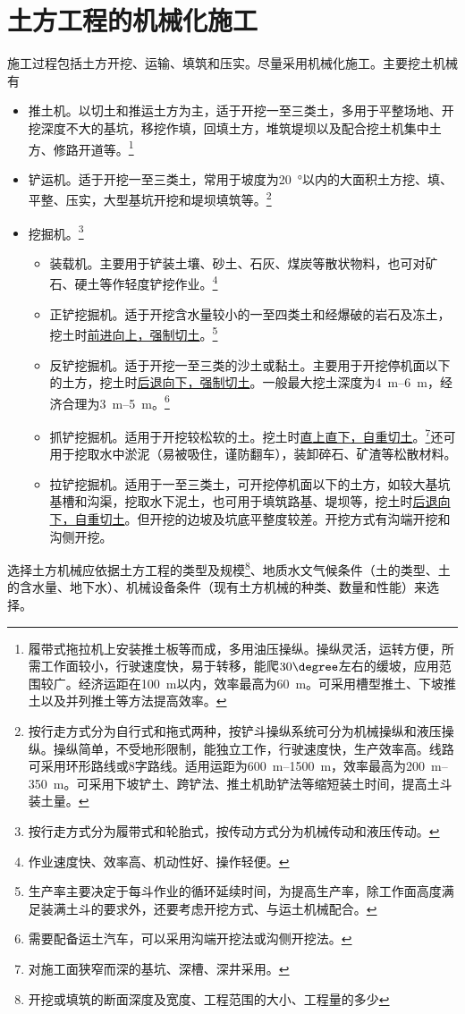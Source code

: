\documentclass{book}
\begin{document}
\section{土方工程的机械化施工}
\par 施工过程包括土方开挖、运输、填筑和压实。尽量采用机械化施工。主要挖土机械有
\begin{itemize}
    \item 推土机。以切土和推运土方为主，适于开挖一至三类土，多用于平整场地、开挖深度不大的基坑，移挖作填，回填土方，堆筑堤坝以及配合挖土机集中土方、修路开道等。\footnote{履带式拖拉机上安装推土板等而成，多用油压操纵。操纵灵活，运转方便，所需工作面较小，行驶速度快，易于转移，能爬$30\degree$左右的缓坡，应用范围较广。经济运距在\SI{100}{\m}以内，效率最高为\SI{60}{\m}。可采用槽型推土、下坡推土以及并列推土等方法提高效率。}
    \item 铲运机。适于开挖一至三类土，常用于坡度为\SI{20}{\degree}以内的大面积土方挖、填、平整、压实，大型基坑开挖和堤坝填筑等。\footnote{按行走方式分为自行式和拖式两种，按铲斗操纵系统可分为机械操纵和液压操纵。操纵简单，不受地形限制，能独立工作，行驶速度快，生产效率高。线路可采用环形路线或$8$字路线。适用运距为\SIrange{600}{1500}{\m}，效率最高为\SIrange{200}{350}{\m}。可采用下坡铲土、跨铲法、推土机助铲法等缩短装土时间，提高土斗装土量。}
    \item 挖掘机。\footnote{按行走方式分为履带式和轮胎式，按传动方式分为机械传动和液压传动。}
          \begin{itemize}
              \item 装载机。主要用于铲装土壤、砂土、石灰、煤炭等散状物料，也可对矿石、硬土等作轻度铲挖作业。\footnote{作业速度快、效率高、机动性好、操作轻便。}
              \item 正铲挖掘机。适于开挖含水量较小的一至四类土和经爆破的岩石及冻土，挖土时\uline{前进向上，强制切土}。\footnote{生产率主要决定于每斗作业的循环延续时间，为提高生产率，除工作面高度满足装满土斗的要求外，还要考虑开挖方式、与运土机械配合。}
              \item 反铲挖掘机。适于开挖一至三类的沙土或黏土。主要用于开挖停机面以下的土方，挖土时\uline{后退向下，强制切土}。一般最大挖土深度为\SIrange{4}{6}{\m}，经济合理为\SIrange{3}{5}{\m}。\footnote{需要配备运土汽车，可以采用沟端开挖法或沟侧开挖法。}
              \item 抓铲挖掘机。适用于开挖较松软的土。挖土时\uline{直上直下，自重切土}。\footnote{对施工面狭窄而深的基坑、深槽、深井采用。}还可用于挖取水中淤泥（易被吸住，谨防翻车），装卸碎石、矿渣等松散材料。
              \item 拉铲挖掘机。适用于一至三类土，可开挖停机面以下的土方，如较大基坑基槽和沟渠，挖取水下泥土，也可用于填筑路基、堤坝等，挖土时\uline{后退向下，自重切土}。但开挖的边坡及坑底平整度较差。开挖方式有沟端开挖和沟侧开挖。
          \end{itemize}
\end{itemize}
\par 选择土方机械应依据土方工程的类型及规模\footnote{开挖或填筑的断面深度及宽度、工程范围的大小、工程量的多少}、地质水文气候条件（土的类型、土的含水量、地下水）、机械设备条件（现有土方机械的种类、数量和性能）来选择。
\end{document}
